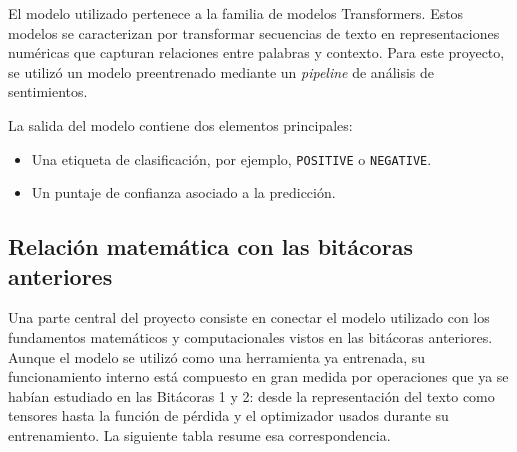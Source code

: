\documentclass[11pt,letterpaper]{article}
\begin{document}
	El modelo utilizado pertenece a la familia de modelos Transformers. Estos modelos se caracterizan por transformar secuencias de texto en representaciones numéricas que capturan relaciones entre palabras y contexto. Para este proyecto, se utilizó un modelo preentrenado mediante un \textit{pipeline} de análisis de sentimientos.
	
	La salida del modelo contiene dos elementos principales:
	
	\begin{itemize}
		\item Una etiqueta de clasificación, por ejemplo, \texttt{POSITIVE} o \texttt{NEGATIVE}.
		\item Un puntaje de confianza asociado a la predicción.
	\end{itemize}
	
	\subsection{Relación matemática con las bitácoras anteriores}
	
	Una parte central del proyecto consiste en conectar el modelo utilizado con los fundamentos matemáticos y computacionales vistos en las bitácoras anteriores. Aunque el modelo se utilizó como una herramienta ya entrenada, su funcionamiento interno está compuesto en gran medida por operaciones que ya se habían estudiado en las Bitácoras 1 y 2: desde la representación del texto como tensores hasta la función de pérdida y el optimizador usados durante su entrenamiento. La siguiente tabla resume esa correspondencia.
	
\end{document}
